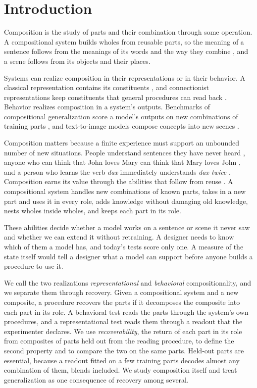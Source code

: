 \documentclass[10pt]{article}
\theoremstyle{plain}
\theoremstyle{remark}
\begin{document}
\section{Introduction}
\label{sec:intro}

Composition is the study of parts and their combination through some operation. A compositional system builds wholes from reusable parts, so the meaning of a sentence follows from the meanings of its words and the way they combine \citep{frege1923,janssen1997}, and a scene follows from its objects and their places.

Systems can realize composition in their representations or in their behavior. A classical representation contains its constituents \citep{fodor1988}, and connectionist representations keep constituents that general procedures can read back \citep{hinton1990,smolensky1990,vangelder1990}. Behavior realizes composition in a system's outputs. Benchmarks of compositional generalization score a model's outputs on new combinations of training parts \citep{lake2018,keysers2020,hupkes2020}, and text-to-image models compose concepts into new scenes \citep{ramesh2021}.

Composition matters because a finite experience must support an unbounded number of new situations. People understand sentences they have never heard \citep{chomsky1957}, anyone who can think that John loves Mary can think that Mary loves John \citep{fodor1988}, and a person who learns the verb \emph{dax} immediately understands \emph{dax twice} \citep{lake2018}. Composition earns its value through the abilities that follow from reuse \citep{lake2017}. A compositional system handles new combinations of known parts, takes in a new part and uses it in every role, adds knowledge without damaging old knowledge, nests wholes inside wholes, and keeps each part in its role.

These abilities decide whether a model works on a sentence or scene it never saw and whether we can extend it without retraining. A designer needs to know which of them a model has, and today's tests score only one. A measure of the state itself would tell a designer what a model can support before anyone builds a procedure to use it.

We call the two realizations \emph{representational} and \emph{behavioral} compositionality, and we separate them through recovery. Given a compositional system and a new composite, a procedure recovers the parts if it decomposes the composite into each part in its role. A behavioral test reads the parts through the system's own procedures, and a representational test reads them through a readout that the experimenter declares. We use \emph{recoverability}, the return of each part in its role from composites of parts held out from the reading procedure, to define the second property and to compare the two on the same parts. Held-out parts are essential, because a readout fitted on a few training parts decodes almost any combination of them, blends included. We study composition itself and treat generalization as one consequence of recovery among several.
\end{document}
